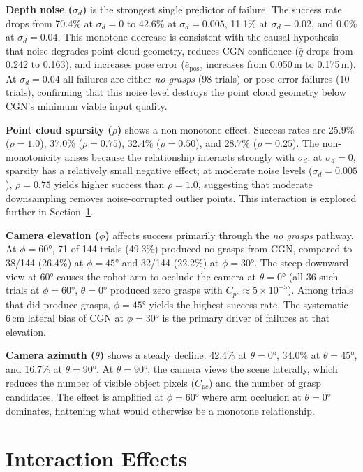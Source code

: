 \documentclass[11pt,a4paper]{report}
\begin{document}
\textbf{Depth noise ($\sigma_d$)} is the strongest single predictor of failure. The success rate drops from 70.4\% at $\sigma_d = 0$ to 42.6\% at $\sigma_d = 0.005$, 11.1\% at $\sigma_d = 0.02$, and 0.0\% at $\sigma_d = 0.04$. This monotone decrease is consistent with the causal hypothesis that noise degrades point cloud geometry, reduces CGN confidence ($\bar{q}$ drops from 0.242 to 0.163), and increases pose error ($\bar{e}_{\text{pose}}$ increases from 0.050\,m to 0.175\,m). At $\sigma_d = 0.04$ all failures are either \textit{no grasps} (98 trials) or pose-error failures (10 trials), confirming that this noise level destroys the point cloud geometry below CGN's minimum viable input quality.

\textbf{Point cloud sparsity ($\rho$)} shows a non-monotone effect. Success rates are 25.9\% ($\rho = 1.0$), 37.0\% ($\rho = 0.75$), 32.4\% ($\rho = 0.50$), and 28.7\% ($\rho = 0.25$). The non-monotonicity arises because the relationship interacts strongly with $\sigma_d$: at $\sigma_d = 0$, sparsity has a relatively small negative effect; at moderate noise levels ($\sigma_d = 0.005$), $\rho = 0.75$ yields higher success than $\rho = 1.0$, suggesting that moderate downsampling removes noise-corrupted outlier points. This interaction is explored further in Section~\ref{sec:interaction}.

\textbf{Camera elevation ($\phi$)} affects success primarily through the \textit{no grasps} pathway. At $\phi = 60°$, 71 of 144 trials (49.3\%) produced no grasps from CGN, compared to 38/144 (26.4\%) at $\phi = 45°$ and 32/144 (22.2\%) at $\phi = 30°$. The steep downward view at $60°$ causes the robot arm to occlude the camera at $\theta = 0°$ (all 36 such trials at $\phi = 60°$, $\theta = 0°$ produced zero grasps with $C_{pc} \approx 5 \times 10^{-5}$). Among trials that did produce grasps, $\phi = 45°$ yields the highest success rate. The systematic 6\,cm lateral bias of CGN at $\phi = 30°$ is the primary driver of failures at that elevation.

\textbf{Camera azimuth ($\theta$)} shows a steady decline: 42.4\% at $\theta = 0°$, 34.0\% at $\theta = 45°$, and 16.7\% at $\theta = 90°$. At $\theta = 90°$, the camera views the scene laterally, which reduces the number of visible object pixels ($C_{pc}$) and the number of grasp candidates. The effect is amplified at $\phi = 60°$ where arm occlusion at $\theta = 0°$ dominates, flattening what would otherwise be a monotone relationship.

\section{Interaction Effects}
\label{sec:interaction}
\end{document}
